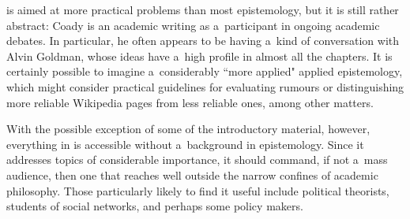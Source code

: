  is aimed at more practical problems than most epistemology, but it is still rather abstract: Coady is an academic writing as a~participant in ongoing academic debates. In particular, he often appears to be having a~kind of conversation with Alvin Goldman, whose ideas have a~high profile in almost all the chapters. It is certainly possible to imagine a~considerably ``more applied" applied epistemology, which might consider practical guidelines for evaluating rumours or distinguishing more reliable Wikipedia pages from less reliable ones, among other matters. 

With the possible exception of some of the introductory material, however, everything in  is accessible without a~background in epistemology. Since it addresses topics of considerable importance, it should command, if not a~mass audience, then one that reaches well outside the narrow confines of academic philosophy. Those particularly likely to find it useful include political theorists, students of social networks, and perhaps some policy makers. 
